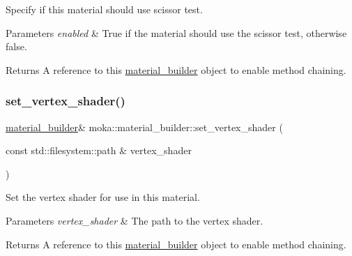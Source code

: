 Specify if this material should use scissor test. 


\begin{DoxyParams}{Parameters}
{\em enabled} & True if the material should use the scissor test, otherwise false. \\
\hline
\end{DoxyParams}
\begin{DoxyReturn}{Returns}
A reference to this \mbox{\hyperlink{classmoka_1_1material__builder}{material\+\_\+builder}} object to enable method chaining. 
\end{DoxyReturn}
\mbox{\label{classmoka_1_1material__builder_a0feeb28a696c2a2920f6d082886f2b27}} 
\subsubsection{\texorpdfstring{set\_vertex\_shader()}{set\_vertex\_shader()}\hspace{0.1cm}{\footnotesize\ttfamily [1/3]}}
{\footnotesize\ttfamily \mbox{\hyperlink{classmoka_1_1material__builder}{material\+\_\+builder}}\& moka\+::material\+\_\+builder\+::set\+\_\+vertex\+\_\+shader (\begin{DoxyParamCaption}\item[{const std\+::filesystem\+::path \&}]{vertex\+\_\+shader }\end{DoxyParamCaption})}



Set the vertex shader for use in this material. 


\begin{DoxyParams}{Parameters}
{\em vertex\+\_\+shader} & The path to the vertex shader. \\
\hline
\end{DoxyParams}
\begin{DoxyReturn}{Returns}
A reference to this \mbox{\hyperlink{classmoka_1_1material__builder}{material\+\_\+builder}} object to enable method chaining. 
\end{DoxyReturn}
\mbox{\label{classmoka_1_1material__builder_a837ee2848797bb997756598d478e3002}} 
